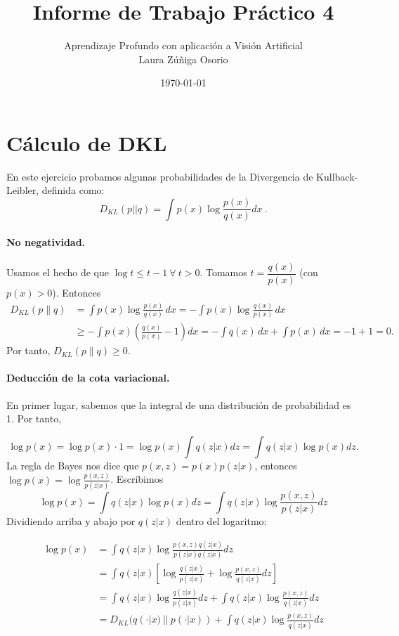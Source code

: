 \documentclass[a4paper,12pt]{article}
\title{Informe de Trabajo Práctico 4}
\author{Aprendizaje Profundo con aplicación a Visión Artificial \\
Laura Zúñiga Osorio}
\date{\today}
\begin{document}
\maketitle

\section{Cálculo de DKL}
En este ejercicio probamos algunas probabilidades de la Divergencia de Kullback-Leibler, definida como:
\begin{equation}
    D_{KL} (p||q) = \int p(x) \log{\frac{p(x)}{q(x)}} dx~.
\end{equation}

\paragraph{No negatividad.} Usamos el hecho de que $\log{t}\leq t-1~ \forall~ t>0$. Tomamos $t=\dfrac{q(x)}{p(x)}$ (con $p(x)>0$). Entonces
\begin{align*}
D_{KL}(p\|q)
&= \int p(x)\log\frac{p(x)}{q(x)}\,dx
= -\int p(x)\log\frac{q(x)}{p(x)}\,dx\\
&\ge -\int p(x)\!\left(\frac{q(x)}{p(x)}-1\right)\!dx
= -\int q(x)\,dx + \int p(x)\,dx = -1+1 = 0.
\end{align*}
Por tanto, $D_{KL}(p\|q)\ge 0$.


\paragraph{Deducción de la cota variacional.} 

En primer lugar, sabemos que la integral de una distribución de probabilidad es 1. Por tanto,

\begin{equation}
    \log{p(x)} = \log{p(x)}\cdot 1 = \log{p(x)}\int q(z|x)dz =  \int q(z|x)\log{p(x)} dz.
\end{equation}
La regla de Bayes nos dice que $p(x,z)=p(x)p(z|x)$, entonces $\log{p(x)} = \log{\frac{p(x,z)}{p(z|x)}}$.
Escribimos 
\begin{equation}
    \log{p(x)} = \int q(z|x) \log{p(x)} dz = \int q(z|x) \log{\frac{p(x,z)}{p(z|x)}} dz
\end{equation}
Dividiendo arriba y abajo por $q(z|x)$ dentro del logaritmo:

\begin{align}
    \log{p(x)} &= \int q(z|x) \log{\frac{p(x,z) q(z|x)}{p(z|x)q(z|x)}} dz \\
    &= \int q(z|x) \left[ \log{\frac{q(z|x)}{p(z|x)}}+\log{\frac{p(x,z)}{q(z|x)}} dz \right] \\
    &= \int q(z|x) \log{\frac{q(z|x)}{p(z|x)}}dz + \int q(z|x)\log{\frac{p(x,z)}{q(z|x)}}dz \\
    &= D_{KL}(q(\cdot|x)~||~p(\cdot|x)) + \int q(z|x)\log{\frac{p(x,z)}{q(z|x)}}dz
\end{align}
\end{document}
